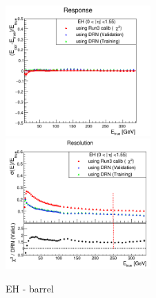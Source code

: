 \begin{figure}
\includegraphics[width=0.495\textwidth]{./plots_pdf/HCAL_plots/Trained_target_ratioflip_0_500_10/pdf/EH_barrel/barrel_corrEtaBarrelEcalHcal.png}
\includegraphics[width=0.495\textwidth]{./plots_pdf/HCAL_plots/Trained_target_ratioflip_0_500_10/pdf/EH_barrel/barrel_corrEtaBarrelEcalHcal_reso.png}
\caption{EH - barrel}
\end{figure}                                                                                                                                                                      

